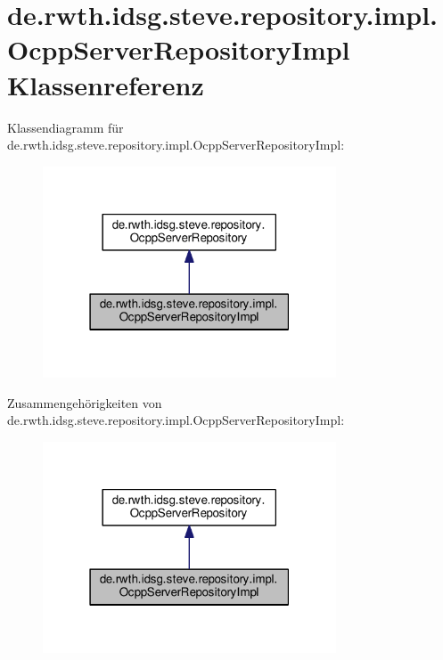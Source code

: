 \hypertarget{classde_1_1rwth_1_1idsg_1_1steve_1_1repository_1_1impl_1_1_ocpp_server_repository_impl}{\section{de.\+rwth.\+idsg.\+steve.\+repository.\+impl.\+Ocpp\+Server\+Repository\+Impl Klassenreferenz}
\label{classde_1_1rwth_1_1idsg_1_1steve_1_1repository_1_1impl_1_1_ocpp_server_repository_impl}
}


Klassendiagramm für de.\+rwth.\+idsg.\+steve.\+repository.\+impl.\+Ocpp\+Server\+Repository\+Impl\+:\nopagebreak
\begin{figure}[H]
\begin{center}
\leavevmode
\includegraphics[width=247pt]{classde_1_1rwth_1_1idsg_1_1steve_1_1repository_1_1impl_1_1_ocpp_server_repository_impl__inherit__graph}
\end{center}
\end{figure}


Zusammengehörigkeiten von de.\+rwth.\+idsg.\+steve.\+repository.\+impl.\+Ocpp\+Server\+Repository\+Impl\+:\nopagebreak
\begin{figure}[H]
\begin{center}
\leavevmode
\includegraphics[width=247pt]{classde_1_1rwth_1_1idsg_1_1steve_1_1repository_1_1impl_1_1_ocpp_server_repository_impl__coll__graph}
\end{center}
\end{figure}
